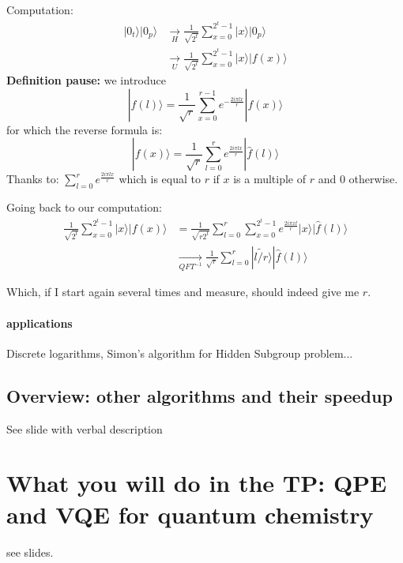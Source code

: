 \documentclass{article}
\begin{document}
Computation:
\begin{align*}
    |0_t\rangle|0_p\rangle &\xrightarrow[H]{} \frac{1}{\sqrt{2^t}} \sum_{x=0}^{2^t-1} |x\rangle|0_p\rangle \\
    &\xrightarrow[U]{} \frac{1}{\sqrt{2^t}}\sum_{x=0}^{2^t-1} |x\rangle|f(x)\rangle
\end{align*}
\textbf{Definition pause: } we introduce $$|\hat{f}(l)\rangle = \frac{1}{\sqrt{r}} \sum_{x=0}^{r-1} e^{-\frac{2i\pi l x}{r}} |f(x)\rangle $$
for which the reverse formula is:
$$|f(x)\rangle = \frac{1}{\sqrt{r}} \sum_{l=0}^{r} e^{\frac{2i\pi lx}{r}} |\hat{f}(l)\rangle  $$
Thanks to: 
$\sum_{l=0}^{r} e^{\frac{2i\pi l x}{r}}$ which is equal to $r$ if $x$ is a multiple of $r$ and $0$ otherwise.

Going back to our computation:
\begin{align*}
\frac{1}{\sqrt{2^t}}\sum_{x=0}^{2^t-1} |x\rangle|f(x)\rangle &= 
    \frac{1}{\sqrt{r 2^t}}\sum_{l=0}^{r}\sum_{x=0}^{2^t-1}e^{\frac{2i\pi x l}{r}} |x\rangle|\hat{f}(l)\rangle\\
    &\xrightarrow[QFT^{-1}]{} \frac{1}{\sqrt{r}} \sum_{l=0}^{r} |\tilde{l/r}\rangle|\hat{f}(l)\rangle
\end{align*}

Which, if I start again several times and measure, should indeed give me $r$.

\paragraph{applications} Discrete logarithms, Simon's algorithm for 
Hidden Subgroup problem...

\subsection{Overview: other algorithms and their speedup}
See slide with verbal description


\section{What you will do in the TP: QPE and VQE for quantum chemistry}
see slides.
\end{document}
